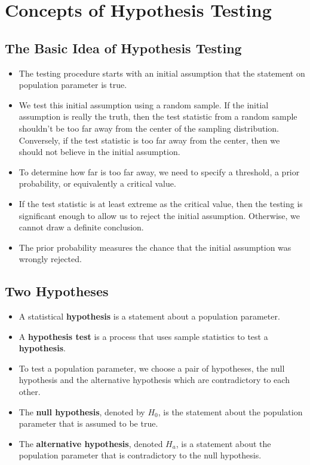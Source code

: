 
\hypertarget{concepts-of-hypothesis-testing}{%
\section{Concepts of Hypothesis
Testing}\label{concepts-of-hypothesis-testing}}

\hypertarget{the-basic-idea-of-hypothesis-testing}{%
\subsection{The Basic Idea of Hypothesis
Testing}\label{the-basic-idea-of-hypothesis-testing}}

\begin{itemize}
\item
  The testing procedure starts with an initial assumption that the
  statement on population parameter is true.
\item
  We test this initial assumption using a random sample. If the initial
  assumption is really the truth, then the test statistic from a random
  sample shouldn't be too far away from the center of the sampling
  distribution. Conversely, if the test statistic is too far
  away from the center, then we should not believe in the
  initial assumption.
\item
  To determine how far is too far away, we need to specify a threshold,
  a prior probability, or equivalently a critical value.
\item
  If the test statistic is at least extreme as the critical value, then
  the testing is significant enough to allow us to reject the initial
  assumption. Otherwise, we cannot draw a definite conclusion.
\item
  The prior probability measures the chance that the initial assumption
  was wrongly rejected.
\end{itemize}

\hypertarget{two-hypotheses}{%
\subsection{Two Hypotheses}\label{two-hypotheses}}

\begin{itemize}
\item
  A statistical \textbf{hypothesis} is a statement about a population
  parameter.
\item
  A \textbf{hypothesis test} is a process that uses sample statistics to
  test a \textbf{hypothesis}.
\item
  To test a population parameter, we choose a pair of hypotheses, the
  null hypothesis and the alternative hypothesis which are contradictory
  to each other.
\item
  The \textbf{null hypothesis}, denoted by \(H_0\), is the statement
  about the population parameter that is assumed to be true.
\item
  The \textbf{alternative hypothesis}, denoted \(H_a\), is a statement
  about the population parameter that is contradictory to the null
  hypothesis.
\end{itemize}

